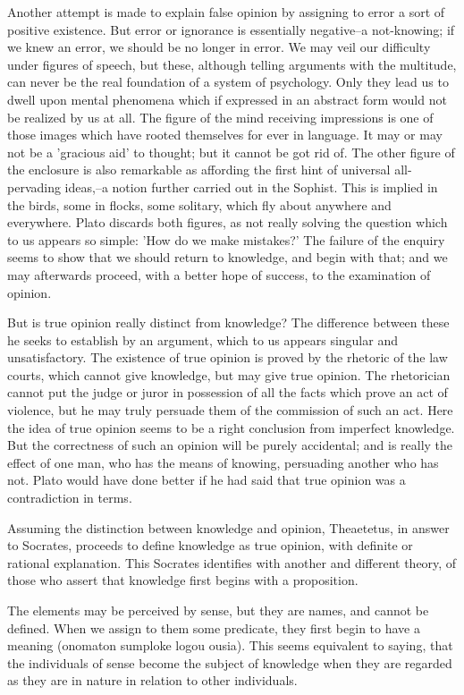 Another attempt is made to explain false opinion by assigning to error
a sort of positive existence. But error or ignorance is essentially
negative--a not-knowing; if we knew an error, we should be no longer in
error. We may veil our difficulty under figures of speech, but these,
although telling arguments with the multitude, can never be the real
foundation of a system of psychology. Only they lead us to dwell upon
mental phenomena which if expressed in an abstract form would not be
realized by us at all. The figure of the mind receiving impressions is
one of those images which have rooted themselves for ever in language.
It may or may not be a 'gracious aid' to thought; but it cannot be
got rid of. The other figure of the enclosure is also remarkable as
affording the first hint of universal all-pervading ideas,--a notion
further carried out in the Sophist. This is implied in the birds, some
in flocks, some solitary, which fly about anywhere and everywhere. Plato
discards both figures, as not really solving the question which to us
appears so simple: 'How do we make mistakes?' The failure of the enquiry
seems to show that we should return to knowledge, and begin with that;
and we may afterwards proceed, with a better hope of success, to the
examination of opinion.

But is true opinion really distinct from knowledge? The difference
between these he seeks to establish by an argument, which to us appears
singular and unsatisfactory. The existence of true opinion is proved
by the rhetoric of the law courts, which cannot give knowledge, but
may give true opinion. The rhetorician cannot put the judge or juror in
possession of all the facts which prove an act of violence, but he may
truly persuade them of the commission of such an act. Here the idea of
true opinion seems to be a right conclusion from imperfect knowledge.
But the correctness of such an opinion will be purely accidental; and is
really the effect of one man, who has the means of knowing, persuading
another who has not. Plato would have done better if he had said that
true opinion was a contradiction in terms.

Assuming the distinction between knowledge and opinion, Theaetetus, in
answer to Socrates, proceeds to define knowledge as true opinion, with
definite or rational explanation. This Socrates identifies with another
and different theory, of those who assert that knowledge first begins
with a proposition.

The elements may be perceived by sense, but they are names, and cannot
be defined. When we assign to them some predicate, they first begin to
have a meaning (onomaton sumploke logou ousia). This seems equivalent
to saying, that the individuals of sense become the subject of knowledge
when they are regarded as they are in nature in relation to other
individuals.

